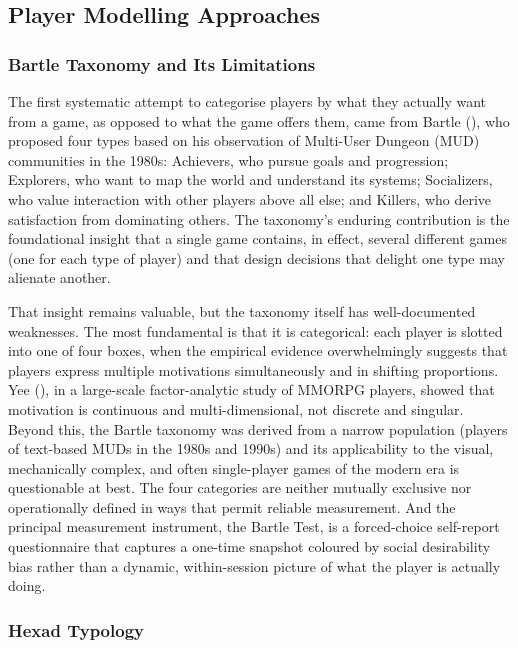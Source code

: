 \subsection{Player Modelling Approaches}

\subsubsection{Bartle Taxonomy and Its Limitations}

The first systematic attempt to categorise players by what they actually want from a game, as opposed to what the game offers them, came from Bartle (\citeyear{bartle1996hearts}), who proposed four types based on his observation of Multi-User Dungeon (MUD) communities in the 1980s: Achievers, who pursue goals and progression; Explorers, who want to map the world and understand its systems; Socializers, who value interaction with other players above all else; and Killers, who derive satisfaction from dominating others. The taxonomy's enduring contribution is the foundational insight that a single game contains, in effect, several different games (one for each type of player) and that design decisions that delight one type may alienate another.

That insight remains valuable, but the taxonomy itself has well-documented weaknesses. The most fundamental is that it is categorical: each player is slotted into one of four boxes, when the empirical evidence overwhelmingly suggests that players express multiple motivations simultaneously and in shifting proportions. Yee (\citeyear{yee2006motivations}), in a large-scale factor-analytic study of MMORPG players, showed that motivation is continuous and multi-dimensional, not discrete and singular. Beyond this, the Bartle taxonomy was derived from a narrow population (players of text-based MUDs in the 1980s and 1990s) and its applicability to the visual, mechanically complex, and often single-player games of the modern era is questionable at best. The four categories are neither mutually exclusive nor operationally defined in ways that permit reliable measurement. And the principal measurement instrument, the Bartle Test, is a forced-choice self-report questionnaire that captures a one-time snapshot coloured by social desirability bias rather than a dynamic, within-session picture of what the player is actually doing.

\subsubsection{Hexad Typology}

